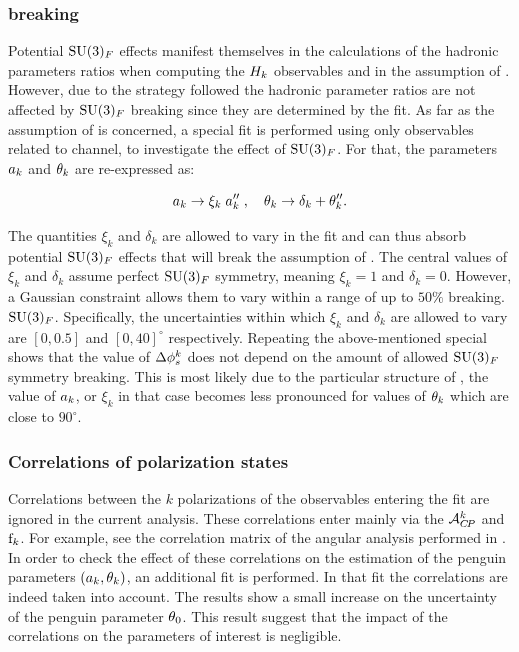 \subsubsection{\grpsuthree breaking}
\label{su3_breaking}
Potential $\mathrm{SU}(3)_F$ effects manifest themselves in the calculations of the hadronic parameters ratios
when computing the $H_{k}$ observables and in the assumption of . However, due to the
strategy followed the hadronic parameter ratios are not affected by $\mathrm{SU}(3)_F$ breaking since they
are determined by the fit. As far as the assumption of  is concerned, a special fit is
performed using only observables related to \BdJpsiRho channel, to investigate the effect of $\mathrm{SU}(3)_F$.
For that, the parameters $a_k$ and $\theta_k$ are re-expressed as:

\begin{equation}
  \centering
  \akPeng \to \xi_k \; \akPeng'' \;, \quad \thkPeng \to \delta_k + \thkPeng''.
\label{su3_breaking_invoke}
\end{equation}

\noindent The quantities $\xi_k$ and $\delta_k$ are allowed to vary in the fit and can thus absorb
potential $\mathrm{SU}(3)_F$ effects that will break the assumption of .
The central values of $\xi_k$ and $\delta_k$ assume perfect $\mathrm{SU}(3)_F$ symmetry, meaning $\xi_k=1$ and $\delta_k=0$.
However, a Gaussian constraint allows them to vary within a range of up to $50\%$ breaking.
$\mathrm{SU}(3)_F$. Specifically, the uncertainties within which $\xi_k$ and $\delta_k$ are allowed to
vary are $[0,0.5]$ and $[0,40]^\circ$ respectively.
Repeating the above-mentioned special shows that the value of $\Delta\phi_{s}^{k}$
does not depend on the amount of allowed $\mathrm{SU}(3)_F$ symmetry breaking.
This is most likely due to the particular structure of , \ie the value of
$a_k$, or $\xi_k$ in that case becomes less pronounced for values of $\theta_k$ which are close to $90^\circ$.

\subsubsection{Correlations of polarization states}
Correlations between the $k$ polarizations of the observables entering the \chisq fit are ignored in the
current analysis. These correlations enter mainly via the $\mathcal{A}_{C\!P}^{k}$ and $\text{f}_{k}$. For example, see the
correlation matrix  of the angular analysis performed in .
In order to check the effect of these correlations on the estimation of the penguin parameters $(a_k,\theta_k)$,
an additional \chisq fit is performed. In that fit the correlations are indeed taken into account.
The results show a small increase on the uncertainty of the penguin parameter $\theta_{0}$.
This result suggest that the impact of the correlations on the parameters of interest is negligible.

